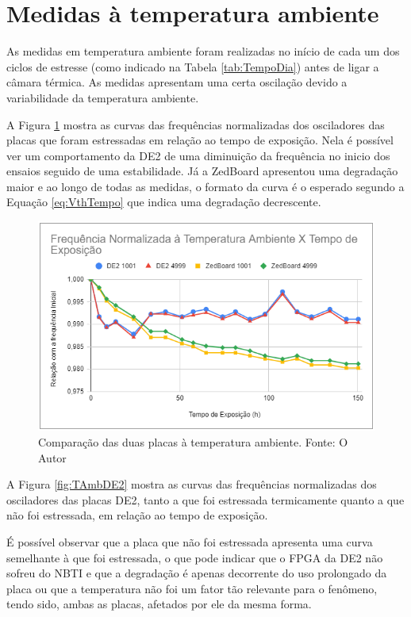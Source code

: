 \section{Medidas à temperatura ambiente}
\label{sec:ResTAmb}

As medidas em temperatura ambiente foram realizadas no início de cada um dos ciclos de estresse (como indicado na Tabela \ref{tab:TempoDia}) antes de ligar a câmara térmica. As medidas apresentam uma certa oscilação devido a variabilidade da temperatura ambiente.

A Figura \ref{fig:TAmbEstressadas} mostra as curvas das frequências normalizadas dos osciladores das placas que foram estressadas em relação ao tempo de exposição. Nela é possível ver um comportamento da DE2 de uma diminuição da frequência no inicio dos ensaios seguido de uma estabilidade. Já a ZedBoard apresentou uma degradação maior e ao longo de todas as medidas, o formato da curva é o esperado segundo a Equação \ref{eq:VthTempo} que indica uma degradação decrescente.

\begin{figure}[H]
    \centering
    \includegraphics[scale=0.75]{figures/Resultados/TAmbEstressadas}
    \caption{Comparação das duas placas à temperatura ambiente. Fonte: O Autor}
    \label{fig:TAmbEstressadas}
\end{figure}

A Figura \ref{fig:TAmbDE2} mostra as curvas das frequências normalizadas dos osciladores das placas  DE2, tanto a que foi estressada termicamente quanto a que não foi estressada, em relação ao tempo de exposição.

É possível observar que a placa que não foi estressada apresenta uma curva semelhante à que foi estressada, o que pode indicar que o FPGA da DE2 não sofreu do NBTI e que a degradação é apenas decorrente do uso prolongado da placa ou que a temperatura não foi um fator tão relevante para o fenômeno, tendo sido, ambas as placas, afetados por ele da mesma forma.


